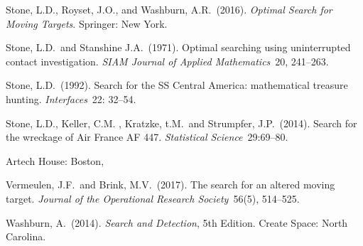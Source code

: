 \documentclass[12pt]{article}
\theoremstyle{plain}
\theoremstyle{definition}
\theoremstyle{remark}
\begin{document}
\begin{description}
\item{} Stone, L.D., Royset, J.O., and Washburn, A.R.~(2016). \emph{Optimal Search for Moving Targets}. Springer: New York.

\item{} Stone, L.D.~and Stanshine J.A.~(1971). Optimal searching using uninterrupted contact investigation.  \emph{SIAM Journal of Applied Mathematics}~20, 241--263.

\item{} Stone, L.D.~(1992). Search for the SS Central America: mathematical treasure hunting. \emph{Interfaces}~22: 32--54. 

\item{} Stone, L.D., Keller, C.M. , Kratzke, t.M.~and Strumpfer, J.P.~(2014). Search for the wreckage of Air France AF 447. \emph{Statistical Science}~29:69--80. 

Artech House: Boston,


\item{} Vermeulen, J.F.~and Brink, M.V.~(2017).   The search for an altered moving target.  \emph{Journal of the Operational Research Society}~56(5), 514--525.

\item{} Washburn, A.~(2014). \emph{Search and Detection}, 5th Edition. Create Space: North Carolina.


\end{description}
\end{document}
